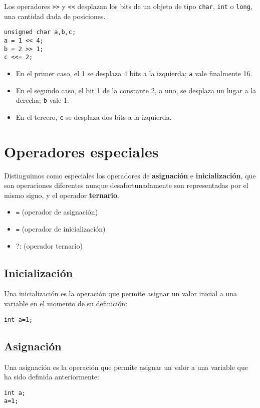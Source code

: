 \begin{ejemplo}
Los operadores \lstinline{>>} y \lstinline{<<} desplazan los bits de un objeto de tipo \lstinline{char}, \lstinline{int} o \lstinline{long}, una cantidad dada de posiciones. 
\begin{lstlisting}
unsigned char a,b,c;
a = 1 << 4;
b = 2 >> 1;
c <<= 2;    
\end{lstlisting}
\begin{itemize}
	\item En el primer caso, el 1 se desplaza 4 bits a la izquierda; \lstinline{a} vale finalmente 16. 
	\item En el segundo caso, el bit 1 de la constante 2, a uno, se desplaza un lugar a la derecha; \lstinline{b} vale 1. 
	\item En el tercero, \lstinline{c} se desplaza dos bits a la izquierda. 
\end{itemize}
\end{ejemplo}


\section{Operadores especiales}

Distinguimos como especiales los operadores de \textbf{asignación} e \textbf{inicialización}, que son operaciones diferentes aunque desafortunadamente son representadas por el mismo signo, y el operador \textbf{ternario}.

\begin{itemize}
	\item \lstinline{=} (operador de asignación)
	\item \lstinline{=} (operador de inicialización)
	\item ?: (operador ternario)
\end{itemize}


\subsection{Inicialización}
Una inicialización es la operación que permite asignar un valor inicial a una variable en el momento de su definición: 
\begin{lstlisting}
int a=1;
\end{lstlisting}


\subsection{Asignación}
Una asignación es la operación que permite asignar un valor a una variable que ha sido definida anteriormente: 
\begin{lstlisting}
int a;
a=1;
\end{lstlisting}

